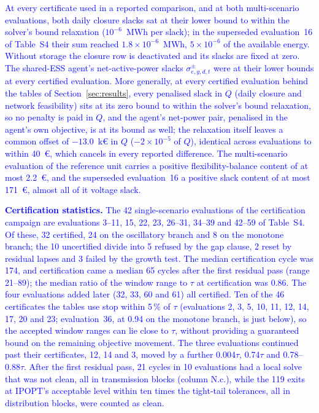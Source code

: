 \documentclass[preprint,12pt]{elsarticle}
\begin{document}
\textcolor{blue}{
    At every certificate used in a reported comparison, and at both multi-scenario evaluations, both daily closure slacks sat at their lower bound to within the solver's bound relaxation ($10^{-6}$~MWh per slack); in the superseded evaluation~16 of Table~S4 their sum reached $1.8 \times 10^{-6}$~MWh, $5 \times 10^{-6}$ of the available energy. Without storage the closure row is deactivated and its slacks are fixed at zero.
    The shared-ESS agent's net-active-power slacks $\sigma^\pm_{e,y,d,t}$ were at their lower bounds at every certified evaluation.
    More generally, at every certified evaluation behind the tables of Section~\ref{sec:results}, every penalised slack in $Q$ (daily closure and network feasibility) sits at its zero bound to within the solver's bound relaxation, so no penalty is paid in $Q$, and the agent's net-power pair, penalised in the agent's own objective, is at its bound as well; the relaxation itself leaves a common offset of $-13.0$~k\euro{} in $Q$ ($-2 \times 10^{-5}$ of $Q$), identical across evaluations to within 40~\euro{}, which cancels in every reported difference. The multi-scenario evaluation of the reference unit carries a positive flexibility-balance content of at most 2.2~\euro{}, and the superseded evaluation~16 a positive slack content of at most 171~\euro{}, almost all of it voltage slack.
}

\textcolor{blue}{
    \textbf{Certification statistics.} The 42 single-scenario evaluations of the certification campaign are evaluations 3--11, 15, 22, 23, 26--31, 34--39 and 42--59 of Table~S4. Of these, 32 certified, 24 on the oscillatory branch and 8 on the monotone branch; the 10 uncertified divide into 5 refused by the gap clause, 2 reset by residual lapses and 3 failed by the growth test. The median certification cycle was 174, and certification came a median 65 cycles after the first residual pass (range 21--89); the median ratio of the window range to $\tau$ at certification was 0.86. The four evaluations added later (32, 33, 60 and 61) all certified. Ten of the 46 certificates the tables use stop within 5\,\% of $\tau$ (evaluations 2, 3, 5, 10, 11, 12, 14, 17, 20 and 23; evaluation~36, at 0.94 on the monotone branch, is just below), so the accepted window ranges can lie close to $\tau$, without providing a guaranteed bound on the remaining objective movement. The three evaluations continued past their certificates, 12, 14 and 3, moved by a further 0.004$\tau$, 0.74$\tau$ and 0.78--0.88$\tau$. After the first residual pass, 21 cycles in 10 evaluations had a local solve that was not clean, all in transmission blocks (column N.c.), while the 119 exits at IPOPT's acceptable level within ten times the tight-tail tolerances, all in distribution blocks, were counted as clean.
}
\end{document}

